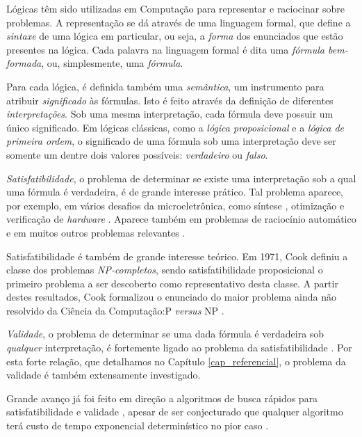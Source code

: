 \indent

Lógicas têm sido utilizadas em Computação para representar e raciocinar sobre problemas. A representação se dá através de uma linguagem formal, que define a \emph{sintaxe} de uma lógica em particular, ou seja, a \emph{forma} dos enunciados que estão presentes na lógica. Cada palavra na linguagem formal é dita uma \emph{fórmula bem-formada}, ou, simplesmente, uma \emph{fórmula}.

Para cada lógica, é definida também uma \emph{semântica}, um instrumento para atribuir \emph{significado} às fórmulas. Isto é feito através da definição de diferentes \emph{interpretações}. Sob uma mesma interpretação, cada fórmula deve possuir um único significado. Em lógicas clássicas, como a \emph{lógica proposicional} e a \emph{lógica de primeira ordem}, o significado de uma fórmula sob uma interpretação deve ser somente um dentre dois valores possíveis: \emph{verdadeiro} ou \emph{falso}.

\emph{Satisfatibilidade}, o problema de determinar se existe uma interpretação sob a qual uma fórmula é verdadeira, é de grande interesse prático. Tal problema aparece, por exemplo, em vários desafios da microeletrônica, como síntese \cite{bloem2014sat}, otimização \cite{nieuwenhuis2006sat} e verificação de \textit{hardware} \cite{gupta2006sat}. Aparece também em problemas de raciocínio automático \cite{harrison2009handbook} e em muitos outros problemas relevantes \cite{horvitz1992automated}.

Satisfatibilidade é também de grande interesse teórico. Em 1971, Cook definiu a classe dos problemas \emph{NP-completos}, sendo satisfatibilidade proposicional o primeiro problema a ser descoberto como representativo desta classe. A partir destes resultados, Cook formalizou o enunciado do maior problema ainda não resolvido da Ciência da Computação:\break P \emph{versus} NP \cite{cook1971complexity}.

\emph{Validade}, o problema de determinar se uma dada fórmula é verdadeira sob \emph{qualquer} interpretação, é fortemente ligado ao problema da satisfatibilidade \cite{kleene68book}. Por esta forte relação, que detalhamos no Capítulo \ref{cap_referencial}, o problema da validade é também extensamente investigado.

Grande avanço já foi feito em direção a algoritmos de busca rápidos para satisfatibilidade e validade \cite{davis1960computing,davis1962machine,biere2009conflict}, apesar de ser conjecturado que qualquer algoritmo terá custo de tempo exponencial determinístico no pior caso \cite{cook1971complexity}.

